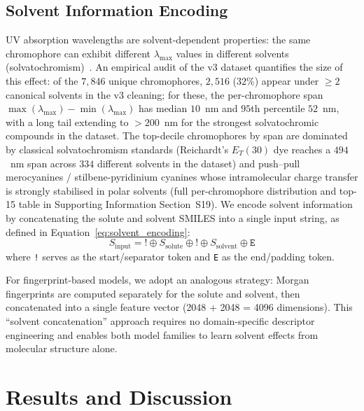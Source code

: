 \documentclass[journal=jcisd8,manuscript=article]{achemso}
\newcommand{\added}[1]{{\color{addedblue}#1}}
\begin{document}
\subsection{Solvent Information Encoding}
\label{sec:solvent}

UV absorption wavelengths are solvent-dependent properties: the same chromophore can exhibit different $\lambda_{\max}$ values in different solvents (solvatochromism)~\cite{reichardt2011solvents}.\added{ An empirical audit of the v3 dataset quantifies the size of this effect: of the $7{,}846$ unique chromophores, $2{,}516$ ($32$\%) appear under $\geq 2$ canonical solvents in the v3 cleaning; for these, the per-chromophore span $\max(\lambda_{\max}) - \min(\lambda_{\max})$ has median $10$~nm and $95$th percentile $52$~nm, with a long tail extending to $> 200$~nm for the strongest solvatochromic compounds in the dataset. The top-decile chromophores by span are dominated by classical solvatochromism standards (Reichardt's $E_T(30)$ dye reaches a $494$~nm span across $334$ different solvents in the dataset) and push--pull merocyanines / stilbene-pyridinium cyanines whose intramolecular charge transfer is strongly stabilised in polar solvents (full per-chromophore distribution and top-15 table in Supporting Information Section~S19).}
We encode solvent information by concatenating the solute and solvent SMILES into a single input string\added{, as defined in Equation~\ref{eq:solvent_encoding}}:
\begin{equation}
\label{eq:solvent_encoding}
 S_{\text{input}} = \texttt{!} \oplus S_{\text{solute}} \oplus \texttt{!} \oplus S_{\text{solvent}} \oplus \texttt{E}
\end{equation}
where \texttt{!} serves as the start/separator token and \texttt{E} as the end/padding token.

For fingerprint-based models, we adopt an analogous strategy: Morgan fingerprints are computed separately for the solute and solvent, then concatenated into a single feature vector (2048 + 2048 = 4096 dimensions).
This ``solvent concatenation'' approach requires no domain-specific descriptor engineering and enables both model families to learn solvent effects from molecular structure alone.


\section{Results and Discussion}
\label{sec:results}
\end{document}
